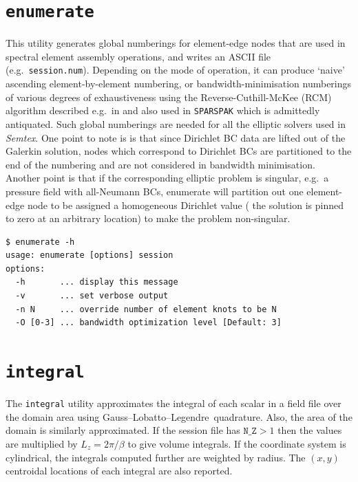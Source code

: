 \documentclass[11pt]{report}
\newcommand{\Semtex}{\emph{Semtex}} \newcommand{\Dog}{\emph{Dog}}
\newcommand{\eg}{e.g.\ } \newcommand{\CC}{\mathrm{c.c.}}
\newcommand\GLL{Gauss--Lobatto--Legendre}
\begin{document}
\section{\texttt{enumerate}}
\label{sec.enumerate}

This utility generates global numberings for element-edge nodes that
are used in spectral element assembly operations, and writes an ASCII
file (\eg \verb|session.num|). Depending on the mode of operation, it
can produce `naive' ascending element-by-element numbering, or
bandwidth-minimisation numberings of various degrees of exhaustiveness
using the Reverse-Cuthill-McKee (RCM) algorithm described \eg in
\citet{george81} and also used in \verb|SPARSPAK| which is admittedly
antiquated.  Such global numberings are needed for all the elliptic
solvers used in \Semtex. One point to note is is that since Dirichlet
BC data are lifted out of the Galerkin solution, nodes which
correspond to Dirichlet BCs are partitioned to the end of the
numbering and are not considered in bandwidth minimisation.  Another
point is that if the corresponding elliptic problem is singular, \eg a
pressure field with all-Neumann BCs, enumerate will partition out one
element-edge node to be assigned a homogeneous Dirichlet value (\ie
the solution is pinned to zero at an arbitrary location) to make the
problem non-singular.

{\small
\begin{verbatim}
$ enumerate -h
usage: enumerate [options] session
options:
  -h       ... display this message
  -v       ... set verbose output
  -n N     ... override number of element knots to be N
  -O [0-3] ... bandwidth optimization level [Default: 3]
\end{verbatim}
}
%

\section{\texttt{integral}}
\label{sec.integral}

The \verb|integral| utility approximates the integral of each scalar
in a field file over the domain area using \GLL\ quadrature.  Also,
the area of the domain is similarly approximated.  If the session file
has $\texttt{N\_Z}>1$ then the values are multiplied by $L_z =
2\pi/\beta$ to give volume integrals.  If the coordinate system is
cylindrical, the integrals computed further are weighted by radius.
The $(x,y)$ centroidal locations of each integral are also reported.
\end{document}
